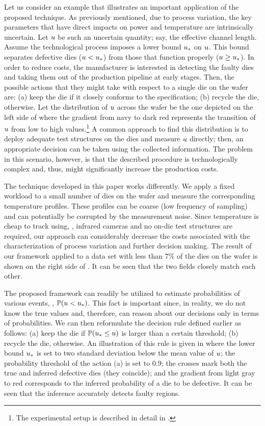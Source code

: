 
Let us consider an example that illustrates an important application of the proposed technique. As previously mentioned, due to process variation, the key parameters that have direct impacts on power and temperature are intrinsically uncertain. Let $u$ be such an uncertain quantity; say, the effective channel length.
Assume the technological process imposes a lower bound $u_*$ on $u$. This bound separates defective dies ($u < u_*$) from those that function properly ($u \geq u_*$).
In order to reduce costs, the manufacturer is interested in detecting the faulty dies and taking them out of the production pipeline at early stages. Then, the possible actions that they might take with respect to a single die on the wafer are: (a) keep the die if it closely conforms to the specification; (b) recycle the die, otherwise.
Let the distribution of $u$ across the wafer be the one depicted on the left side of  where the gradient from navy to dark red represents the transition of $u$ from low to high values.\footnote{The experimental setup is described in detail in .}
A common approach to find this distribution is to deploy adequate test structures on the dies and measure $u$ directly; then, an appropriate decision can be taken using the collected information. The problem in this scenario, however, is that the described procedure is technologically complex and, thus, might significantly increase the production costs.

The technique developed in this paper works differently. We apply a fixed workload to a small number of dies on the wafer and measure the corresponding temperature profiles. These profiles can be coarse (low frequency of sampling) and can potentially be corrupted by the measurement noise. Since temperature is cheap to track using, \eg, infrared cameras and no on-die test structures are required, our approach can considerably decrease the costs associated with the characterization of process variation and further decision making.
The result of our framework applied to a data set with less than $7\%$ of the dies on the wafer is shown on the right side of . It can be seen that the two fields closely match each other.

The proposed framework can readily be utilized to estimate probabilities of various events, \eg, $\mathbb{P}(u < u_*)$. This fact is important since, in reality, we do not know the true values and, therefore, can reason about our decisions only in terms of probabilities. We can then reformulate the decision rule defined earlier as follows: (a) keep the die if $\mathbb{P}(u_* \leq u)$ is larger than a certain threshold; (b) recycle the die, otherwise.
An illustration of this rule is given in  where the lower bound $u_*$ is set to two standard deviation below the mean value of $u$; the probability threshold of the action (a) is set to 0.9; the crosses mark both the true and inferred defective dies (they coincide); and the gradient from light gray to red corresponds to the inferred probability of a die to be defective. It can be seen that the inference accurately detects faulty regions.



